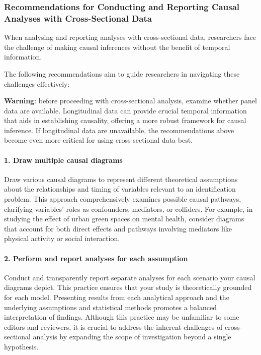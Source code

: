 \documentclass[
  single column]{article}
\let\oldparagraph\paragraph
\renewcommand{\paragraph}[1]{\oldparagraph{#1}\mbox{}}
\begin{document}
\subsubsection{Recommendations for Conducting and Reporting Causal
Analyses with Cross-Sectional
Data}\label{recommendations-for-conducting-and-reporting-causal-analyses-with-cross-sectional-data}

When analysing and reporting analyses with cross-sectional data,
researchers face the challenge of making causal inferences without the
benefit of temporal information.

The following recommendations aim to guide researchers in navigating
these challenges effectively:

\textbf{Warning}: before proceeding with cross-sectional analysis,
examine whether panel data are available. Longitudinal data can provide
crucial temporal information that aids in establishing causality,
offering a more robust framework for causal inference. If longitudinal
data are unavailable, the recommendations above become even more
critical for using cross-sectional data best.

\paragraph{\texorpdfstring{1. \textbf{Draw multiple causal
diagrams}}{1. Draw multiple causal diagrams}}\label{draw-multiple-causal-diagrams}

Draw various causal diagrams to represent different theoretical
assumptions about the relationships and timing of variables relevant to
an identification problem. This approach comprehensively examines
possible causal pathways, clarifying variables' roles as confounders,
mediators, or colliders. For example, in studying the effect of urban
green spaces on mental health, consider diagrams that account for both
direct effects and pathways involving mediators like physical activity
or social interaction.

\paragraph{\texorpdfstring{2. \textbf{Perform and report analyses for
each
assumption}}{2. Perform and report analyses for each assumption}}\label{perform-and-report-analyses-for-each-assumption}

Conduct and transparently report separate analyses for each scenario
your causal diagrams depict. This practice ensures that your study is
theoretically grounded for each model. Presenting results from each
analytical approach and the underlying assumptions and statistical
methods promotes a balanced interpretation of findings. Although this
practice may be unfamiliar to some editors and reviewers, it is crucial
to address the inherent challenges of cross-sectional analysis by
expanding the scope of investigation beyond a single hypothesis.
\end{document}
